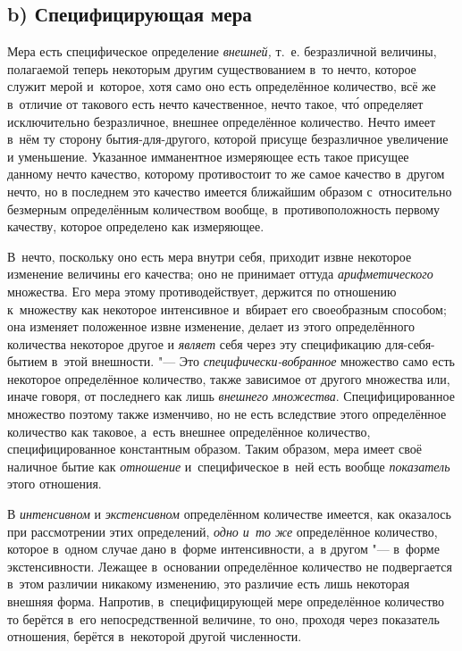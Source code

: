 \subsection[b) Специфицирующая мера]{b) Специфицирующая мера}

Мера есть специфическое определение {\em внешней,} т.~е. безразличной величины,
полагаемой теперь некоторым другим существованием в~то нечто, которое служит
мерой и~которое, хотя само оно есть определённое количество, всё же в~отличие
от такового есть нечто качественное, нечто такое, чт\'{о} определяет
исключительно безразличное, внешнее определённое количество. Нечто имеет в~нём
ту сторону бытия-для-другого, которой присуще безразличное увеличение и
уменьшение. Указанное имманентное измеряющее есть такое присущее данному нечто
качество, которому противостоит то же самое качество в~другом нечто, но в
последнем это качество имеется ближайшим образом с~относительно безмерным
определённым количеством вообще, в~противоположность первому качеству, которое
определено как измеряющее.

В~нечто, поскольку оно есть мера внутри себя, приходит извне некоторое
изменение величины его качества; оно не принимает оттуда {\em арифметического}
множества. Его мера этому противодействует, держится по отношению к~множеству
как некоторое интенсивное и~вбирает его своеобразным способом; она изменяет
положенное извне изменение, делает из этого определённого количества некоторое
другое и {\em являет} себя через эту спецификацию для-себя-бытием в~этой
внешности. "--- Это {\em специфически-вобранное} множество само есть некоторое
определённое количество, также зависимое от другого множества или, иначе
говоря, от последнего как лишь {\em внешнего множества}. Специфицированное
множество поэтому также изменчиво, но не есть вследствие этого определённое
количество как таковое, а~есть внешнее определённое количество,
специфицированное константным образом. Таким образом, мера имеет своё наличное
бытие как {\em отношение} и~специфическое в~ней есть вообще {\em показатель}
этого отношения.

В {\em интенсивном} и {\em экстенсивном} определённом количестве имеется, как
оказалось при рассмотрении этих определений, {\em одно и~то же} определённое
количество, которое в~одном случае дано в~форме интенсивности, а~в другом "---
в~форме экстенсивности. Лежащее в~основании определённое количество не
подвергается в~этом различии никакому изменению, это различие есть лишь
некоторая внешняя форма. Напротив, в~специфицирующей мере определённое
количество то берётся в~его непосредственной величине, то оно, проходя через
показатель отношения, берётся в~некоторой другой численности.

